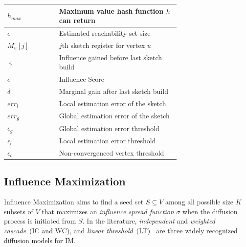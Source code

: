 \documentclass[final,5p,times,twocolumn]{elsarticle}
\newcommand\fixme[1]{#1}
\begin{document}
\begin{table}[!ht]
\begin{small}
\begin{tabular}{|l|p{0.7\linewidth}|}
        $h_{max}$       & Maximum value hash function $h$ can return\\
        \hline\hline
        $e$             & Estimated reachability set size\\
        $M_u[j]$        & $j$th sketch register for vertex $u$\\
        $\varsigma $    & Influence gained before last sketch build\\
        $\sigma $       & Influence Score\\
        $\delta$        & Marginal gain after last sketch build\\
        $err_l$         & Local estimation error of the sketch\\
        $err_g$         & Global estimation error of the sketch\\
        $\epsilon_{g}$    & Global estimation error threshold\\
        $\epsilon_{l}$    & Local estimation error threshold\\ 
        $\epsilon_{c}$    & Non-convergenced vertex threshold\\
        \hline         
    \end{tabular}
    \end{small}
\end{table}
\subsection{Influence Maximization}

Influence Maximization aims to find a seed set $S \subseteq V$ among \fixme{all possible size $K$ subsets of $V$ that maximizes an {\em influence spread function} $\sigma$  when the diffusion process is initiated from $S$.} %
In the literature, {\em independent} and {\em weighted cascade}~(IC and WC), and 
{\em linear threshold}~(LT)~\cite{kempe2003maximizing} are three widely recognized diffusion models for IM.
\end{document}
